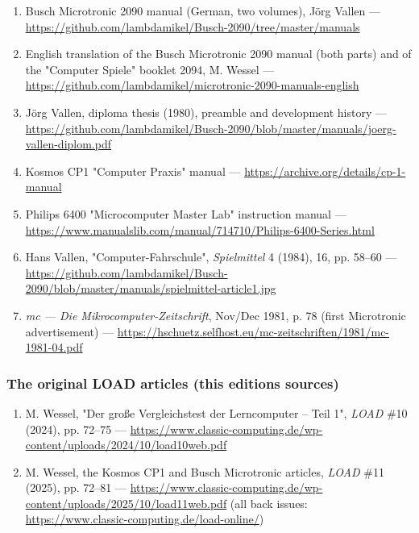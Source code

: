 \documentclass[
  11pt,
  letterpaper,
]{article}
\providecommand{\tightlist}{%
  \setlength{\itemsep}{0pt}\setlength{\parskip}{0pt}}
\begin{document}
\begin{enumerate}
\def\labelenumi{\arabic{enumi}.}
\tightlist
\item
  Busch Microtronic 2090 manual (German, two volumes), Jörg Vallen ---
  \url{https://github.com/lambdamikel/Busch-2090/tree/master/manuals}
\item
  English translation of the Busch Microtronic 2090 manual (both parts)
  and of the "Computer Spiele" booklet 2094, M. Wessel ---
  \url{https://github.com/lambdamikel/microtronic-2090-manuals-english}
\item
  Jörg Vallen, diploma thesis (1980), preamble and development history
  ---
  \url{https://github.com/lambdamikel/Busch-2090/blob/master/manuals/joerg-vallen-diplom.pdf}
\item
  Kosmos CP1 "Computer Praxis" manual ---
  \url{https://archive.org/details/cp-1-manual}
\item
  Philips 6400 "Microcomputer Master Lab" instruction manual ---
  \url{https://www.manualslib.com/manual/714710/Philips-6400-Series.html}
\item
  Hans Vallen, "Computer-Fahrschule", \emph{Spielmittel} 4 (1984), 16,
  pp. 58--60 ---
  \url{https://github.com/lambdamikel/Busch-2090/blob/master/manuals/spielmittel-article1.jpg}
\item
  \emph{mc --- Die Mikrocomputer-Zeitschrift}, Nov/Dec 1981, p. 78
  (first Microtronic advertisement) ---
  \url{https://hschuetz.selfhost.eu/mc-zeitschriften/1981/mc-1981-04.pdf}
\end{enumerate}

\subsubsection{The original LOAD articles (this
edition\textquotesingle s
sources)}\label{the-original-load-articles-this-editions-sources}

\begin{enumerate}
\def\labelenumi{\arabic{enumi}.}
\setcounter{enumi}{7}
\tightlist
\item
  M. Wessel, "Der große Vergleichstest der Lerncomputer -- Teil 1",
  \emph{LOAD} \#10 (2024), pp. 72--75 ---
  \url{https://www.classic-computing.de/wp-content/uploads/2024/10/load10web.pdf}
\item
  M. Wessel, the Kosmos CP1 and Busch Microtronic articles, \emph{LOAD}
  \#11 (2025), pp. 72--81 ---
  \url{https://www.classic-computing.de/wp-content/uploads/2025/10/load11web.pdf}
  (all back issues: \url{https://www.classic-computing.de/load-online/})
\end{enumerate}
\end{document}
